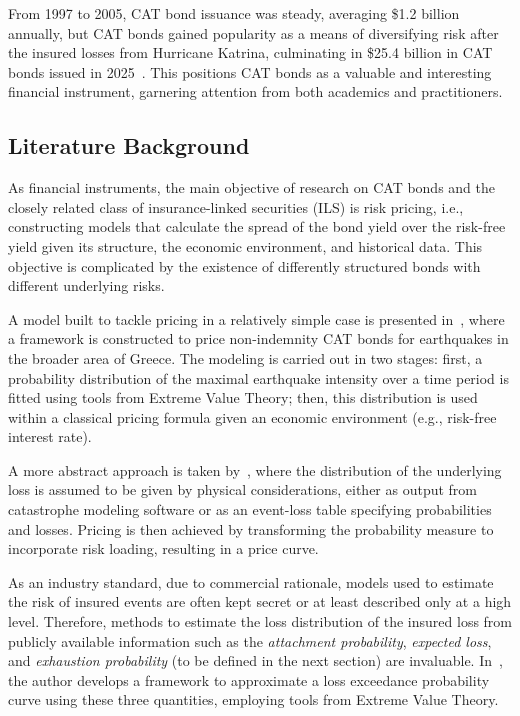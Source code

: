 \documentclass{amsart}
\theoremstyle{plain}
\theoremstyle{definition}
\theoremstyle{definition}
\theoremstyle{remark}
\begin{document}
From 1997 to 2005, CAT bond issuance was steady, averaging \$1.2 billion annually, but CAT bonds gained popularity as a means of diversifying risk after the insured losses from Hurricane Katrina, culminating in \$25.4 billion in CAT bonds issued in 2025~\cite{W:artemis-2025}. This positions CAT bonds as a valuable and interesting financial instrument, garnering attention from both academics and practitioners.

\subsection{Literature Background}
As financial instruments, the main objective of research on CAT bonds and the closely related class of insurance-linked securities (ILS) is risk pricing, i.e., constructing models that calculate the spread of the bond yield over the risk-free yield given its structure, the economic environment, and historical data. This objective is complicated by the existence of differently structured bonds with different underlying risks.

A model built to tackle pricing in a relatively simple case is presented in~\cite{A:zimbidis-et-al-2007}, where a framework is constructed to price non-indemnity CAT bonds for earthquakes in the broader area of Greece. The modeling is carried out in two stages: first, a probability distribution of the maximal earthquake intensity over a time period is fitted using tools from Extreme Value Theory; then, this distribution is used within a classical pricing formula given an economic environment (e.g., risk-free interest rate).

A more abstract approach is taken by~\cite{A:wang-2004}, where the distribution of the underlying loss is assumed to be given by physical considerations, either as output from catastrophe modeling software or as an event-loss table specifying probabilities and losses. Pricing is then achieved by transforming the probability measure to incorporate risk loading, resulting in a price curve.

As an industry standard, due to commercial rationale, models used to estimate the risk of insured events are often kept secret or at least described only at a high level. Therefore, methods to estimate the loss distribution of the insured loss from publicly available information such as the \textit{attachment probability}, \textit{expected loss}, and \textit{exhaustion probability} (to be defined in the next section) are invaluable. In~\cite{A:aviv-2018}, the author develops a framework to approximate a loss exceedance probability curve
using these three quantities, employing tools from Extreme Value Theory.
\end{document}

